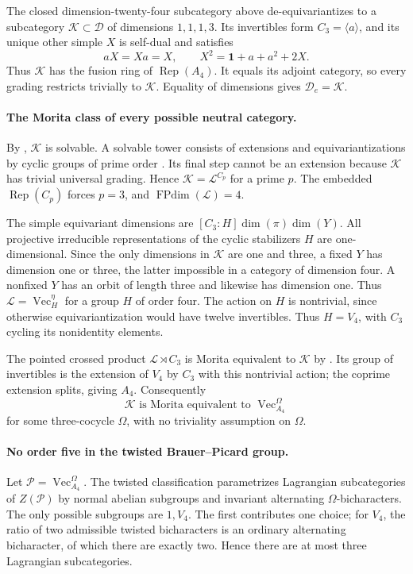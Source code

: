 \documentclass[11pt,a4paper]{article}
\begin{document}
The closed dimension-twenty-four subcategory above de-equivariantizes
to a subcategory $\mathcal K\subset\mathcal D$ of dimensions $1,1,1,3$.
Its invertibles form $C_3=\langle a\rangle$, and its unique other simple
$X$ is self-dual and satisfies
\[
 aX=Xa=X,\qquad X^2=\mathbf1+a+a^2+2X.
\]
Thus $\mathcal K$ has the fusion ring of $\operatorname{Rep}(A_4)$.
It equals its adjoint category, so every grading restricts trivially to
$\mathcal K$. Equality of dimensions gives $\mathcal D_e=\mathcal K$.

\paragraph{The Morita class of every possible neutral category.}
By \cite[Theorem~1.6]{ENOSolvable}, $\mathcal K$ is solvable. A solvable
tower consists of extensions and equivariantizations by cyclic groups of
prime order \cite[Definition~1.2 and Proposition~4.4]{ENOSolvable}.
Its final step cannot be an extension because $\mathcal K$ has trivial
universal grading. Hence $\mathcal K=\mathcal L^{C_p}$ for a prime $p$.
The embedded $\operatorname{Rep}(C_p)$ forces $p=3$, and
$\operatorname{FPdim}(\mathcal L)=4$.

The simple equivariant dimensions are $[C_3:H]\dim(\pi)\dim(Y)$.
All projective irreducible representations of the cyclic stabilizers $H$
are one-dimensional. Since the only dimensions in $\mathcal K$ are one
and three, a fixed $Y$ has dimension one or three, the latter impossible
in a category of dimension four. A nonfixed $Y$ has an orbit of length
three and likewise has dimension one. Thus
$\mathcal L=\operatorname{Vec}_H^\eta$ for a group $H$ of order four.
The action on $H$ is nontrivial, since otherwise equivariantization would
have twelve invertibles. Thus $H=V_4$, with $C_3$ cycling its nonidentity
elements.

The pointed crossed product $\mathcal L\rtimes C_3$ is Morita equivalent
to $\mathcal K$ by \cite[Proposition~2.2]{ENOSolvable}. Its group of
invertibles is the extension of $V_4$ by $C_3$ with this nontrivial action;
the coprime extension splits, giving $A_4$. Consequently
\[
 \mathcal K\text{ is Morita equivalent to }\operatorname{Vec}_{A_4}^\Omega
\]
for some three-cocycle $\Omega$, with no triviality assumption on $\Omega$.

\paragraph{No order five in the twisted Brauer--Picard group.}
Let $\mathcal P=\operatorname{Vec}_{A_4}^\Omega$.
The twisted classification \cite[Theorem~1.2, or Theorem~4.12]{NaiduNikshych}
parametrizes Lagrangian subcategories of $Z(\mathcal P)$ by normal abelian
subgroups and invariant alternating $\Omega$-bicharacters.
The only possible subgroups are $1,V_4$. The first contributes one choice;
for $V_4$, the ratio of two admissible twisted bicharacters is an ordinary
alternating bicharacter, of which there are exactly two. Hence there are
at most three Lagrangian subcategories.
\end{document}

